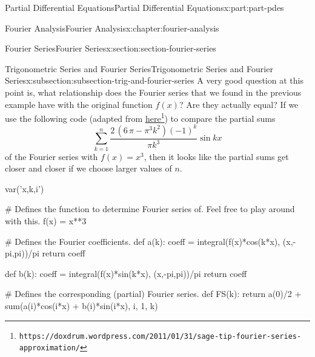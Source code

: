 \documentclass[oneside,10pt,]{book}
\numberwithin{equation}{part}
\begin{document}
\begin{partptx}{Partial Differential Equations}{}{Partial Differential Equations}{}{}{x:part:part-pdes}
\begin{chapterptx}{Fourier Analysis}{}{Fourier Analysis}{}{}{x:chapter:fourier-analysis}
\begin{sectionptx}{Fourier Series}{}{Fourier Series}{}{}{x:section:section-fourier-series}
\begin{subsectionptx}{Trigonometric Series and Fourier Series}{}{Trigonometric Series and Fourier Series}{}{}{x:subsection:subsection-trig-and-fourier-series}
A very good question at this point is, what relationship does the Fourier series that we found in the previous example have with the original function \(f(x)\)? Are they actually equal? If we use the following code (adapted from \href{https://doxdrum.wordpress.com/2011/01/31/sage-tip-fourier-series-approximation/}{here}\footnote{\nolinkurl{https://doxdrum.wordpress.com/2011/01/31/sage-tip-fourier-series-approximation/}\label{g:fn:idp105548780675488}}) to compare the partial sums%
\begin{equation*}
\sum_{k=1}^{n}\frac{2 \, {\left(6 \, \pi - \pi^{3} k^{2}\right)} \left(-1\right)^{k}}{\pi k^{3}}\sin kx
\end{equation*}
of the Fourier series with \(f(x) = x^{3}\), then it looks like the partial sums get closer and closer if we choose larger values of \(n\).%
\begin{sageinput}
var('x,k,i')

# Defines the function to determine Fourier series of. Feel free to play around with this.
f(x) = x**3

# Defines the Fourier coefficients.
def a(k):
  coeff = integral(f(x)*cos(k*x), (x,-pi,pi))/pi
  return coeff

def b(k):
  coeff = integral(f(x)*sin(k*x), (x,-pi,pi))/pi
  return coeff

# Defines the corresponding (partial) Fourier series.
def FS(k):
  return a(0)/2 + sum(a(i)*cos(i*x) + b(i)*sin(i*x), i, 1, k)


\end{sageinput}
\end{subsectionptx}
\end{sectionptx}
\end{chapterptx}
\end{partptx}
\end{document}
